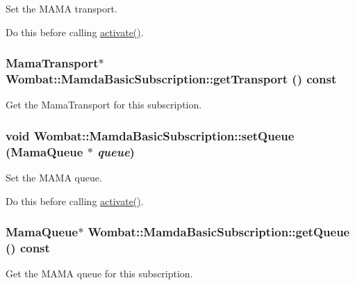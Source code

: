 Set the MAMA transport. 

Do this before calling \hyperlink{classWombat_1_1MamdaBasicSubscription_704ba0b8ec4c027d0357d3e482314605}{activate()}. \hypertarget{classWombat_1_1MamdaBasicSubscription_2f7c11930674c5d70a80021c8a472eaa}{
\subsubsection[getTransport]{\setlength{\rightskip}{0pt plus 5cm}Mama\-Transport$\ast$ Wombat::Mamda\-Basic\-Subscription::get\-Transport () const}}
\label{classWombat_1_1MamdaBasicSubscription_2f7c11930674c5d70a80021c8a472eaa}


Get the Mama\-Transport for this subscription. 

\hypertarget{classWombat_1_1MamdaBasicSubscription_1f4c83cf81bc3e0696f8491b611c75a2}{
\subsubsection[setQueue]{\setlength{\rightskip}{0pt plus 5cm}void Wombat::Mamda\-Basic\-Subscription::set\-Queue (Mama\-Queue $\ast$ {\em queue})}}
\label{classWombat_1_1MamdaBasicSubscription_1f4c83cf81bc3e0696f8491b611c75a2}


Set the MAMA queue. 

Do this before calling \hyperlink{classWombat_1_1MamdaBasicSubscription_704ba0b8ec4c027d0357d3e482314605}{activate()}. \hypertarget{classWombat_1_1MamdaBasicSubscription_9cc1e11b05ef14fbfd8092c831ac300a}{
\subsubsection[getQueue]{\setlength{\rightskip}{0pt plus 5cm}Mama\-Queue$\ast$ Wombat::Mamda\-Basic\-Subscription::get\-Queue () const}}
\label{classWombat_1_1MamdaBasicSubscription_9cc1e11b05ef14fbfd8092c831ac300a}


Get the MAMA queue for this subscription. 

